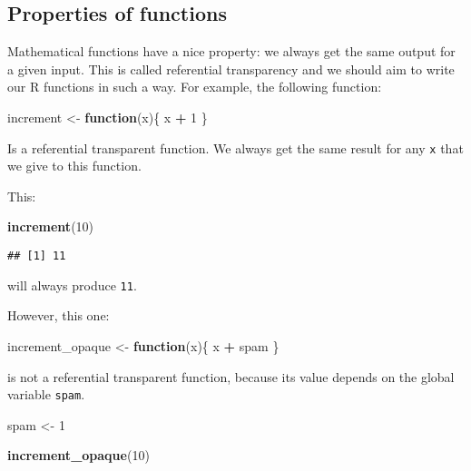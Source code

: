 \documentclass[
]{article}
\newenvironment{Shaded}{\begin{snugshade}}{\end{snugshade}}
\newcommand{\ControlFlowTok}[1]{\textcolor[rgb]{0.13,0.29,0.53}{\textbf{#1}}}
\newcommand{\DecValTok}[1]{\textcolor[rgb]{0.00,0.00,0.81}{#1}}
\newcommand{\KeywordTok}[1]{\textcolor[rgb]{0.13,0.29,0.53}{\textbf{#1}}}
\newcommand{\NormalTok}[1]{#1}
\newcommand{\OperatorTok}[1]{\textcolor[rgb]{0.81,0.36,0.00}{\textbf{#1}}}
\newcommand{\StringTok}[1]{\textcolor[rgb]{0.31,0.60,0.02}{#1}}
\begin{document}
\hypertarget{properties-of-functions}{%
\subsection{Properties of functions}\label{properties-of-functions}}

Mathematical functions have a nice property: we always get the same output for a given input. This
is called referential transparency and we should aim to write our R functions in such a way.
For example, the following function:

\begin{Shaded}
\begin{Highlighting}[]
\NormalTok{increment \textless{}{-}}\StringTok{ }\ControlFlowTok{function}\NormalTok{(x)\{}
\NormalTok{    x }\OperatorTok{+}\StringTok{ }\DecValTok{1}
\NormalTok{\}}
\end{Highlighting}
\end{Shaded}

Is a referential transparent function. We always get the same result for any \texttt{x} that we give to
this function.

This:

\begin{Shaded}
\begin{Highlighting}[]
\KeywordTok{increment}\NormalTok{(}\DecValTok{10}\NormalTok{)}
\end{Highlighting}
\end{Shaded}

\begin{verbatim}
## [1] 11
\end{verbatim}

will always produce \texttt{11}.

However, this one:

\begin{Shaded}
\begin{Highlighting}[]
\NormalTok{increment\_opaque \textless{}{-}}\StringTok{ }\ControlFlowTok{function}\NormalTok{(x)\{}
\NormalTok{    x }\OperatorTok{+}\StringTok{ }\NormalTok{spam}
\NormalTok{\}}
\end{Highlighting}
\end{Shaded}

is not a referential transparent function, because its value depends on the global variable \texttt{spam}.

\begin{Shaded}
\begin{Highlighting}[]
\NormalTok{spam \textless{}{-}}\StringTok{ }\DecValTok{1}

\KeywordTok{increment\_opaque}\NormalTok{(}\DecValTok{10}\NormalTok{)}
\end{Highlighting}
\end{Shaded}
\end{document}

